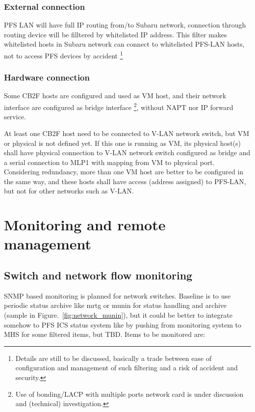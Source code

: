 \documentclass[a4paper,notitlepage]{article}
\begin{document}
\subsubsection{External connection}

PFS LAN will have full IP routing from/to Subaru network, connection through 
routing device will be filltered by whitelisted IP address. This filter makes 
whitelisted hosts in Subaru network can connect to whitelisted PFS-LAN hosts, 
not to access PFS devices by accident
\footnote{Details are still to be discussed, basically a trade between ease 
of configuration and management of such filtering and a risk of accident and 
security.}

\subsubsection{Hardware connection}

Some CB2F hosts are configured and used as VM host, and their network interface 
are configured as bridge interface
\footnote{Use of bonding/LACP with multiple ports network card is under 
discussion and (technical) investigation.}, without NAPT nor IP forward 
service. 

At least one CB2F host need to be connected to V-LAN network switch, but VM or 
physical is not defined yet. If this one is running as VM, its physical host(s) 
shall have physical connection to V-LAN network switch configured as bridge and 
a serial connection to MLP1 with mapping from VM to physical port. Considering 
redundancy, more than one VM host are better to be configured in the same way, 
and these hosts shall have access (address assigned) to PFS-LAN, but not for 
other networks such as V-LAN. 



\section{Monitoring and remote management}

\subsection{Switch and network flow monitoring}

SNMP based monitoring is planned for network switches. 
Baseline is to use periodic status archive like mrtg or munin for status 
handling and archive (sample in Figure.~\ref{fig:network_munin}), but it could 
be better to integrate somehow to PFS ICS status system like by pushing from 
monitoring system to MHS for some filtered items, but TBD.
Items to be monitored are:
\end{document}
